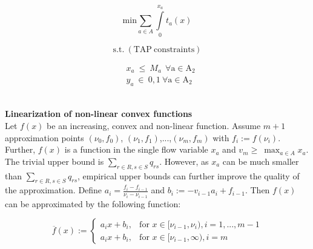 \documentclass[a4paper, 12pt]{article}
\begin{document}
\begin{large}
\boldmath\begin{equation*}
\mathrm{min}\sum_{a\in{A}} \int\limits_{0}^{x_a}t_{a}\left(x\right)
\end{equation*}
\end{large}
\indent\boldmath\begin{large}
\begin{equation*}
\mathrm{s.t.}\ \mathrm{\left(TAP\ constraints\right)}
\end{equation*}
\end{large}
\begin{large}
\begin{align*}
& x_{a}\ \leq\ M_{a}\ \ \mathrm{\forall{a}\in{A_{2}}} \\
& y_{a}\ \in\ {0,1}\ \mathrm{\forall{a}\in{A_{2}}}
\end{align*} %
\end{large} 
\\\textbf{Linearization of non-linear convex functions}\\
Let $f\left(x\right)$ be an increasing, convex and non-linear function. Assume $m+1$ approximation points $\left(\nu_{0},f_{0}\right)$, $\left(\nu_{1},f_{1}\right)$,...,$\left(\nu_{m},f_{m}\right)$ with $f_{i}:=f\left(\nu_{i}\right)$. Further, $f\left(x\right)$ is a function in the single flow variable $x_{a}$ and $v_{m}\geq\ \max_{a\in{A}}{x_{a}}$. The trivial upper bound is $\sum_{r\in{R},s\in{S}} q_{rs}$. However, as $x_{a}$ can be much smaller than $\sum_{r\in{R},s\in{S}} q_{rs}$, empirical upper bounds can further improve the quality of the approximation. Define $a_{i}=\frac{f_{i}-f_{i-1}}{\nu_{i}-\nu_{i-1}}$ and $b_{i}:=-v_{i-1}a_{i}+f_{i-1}$. Then $f\left(x\right)$ can be approximated by the following function:
\begin{large}
\[
 \overline{f}(x) := 
  \begin{cases} 
   a_{i}x+b_{i}, & \text{for }  x \in{[\nu_{i-1},\nu_{i})},i=1,...,m-1  \\
   a_{i}x+b_{i}, & \text{for }  x \in{[\nu_{i-1},\infty)},i=m
  \end{cases}
\]
\end{large}
\end{document}
